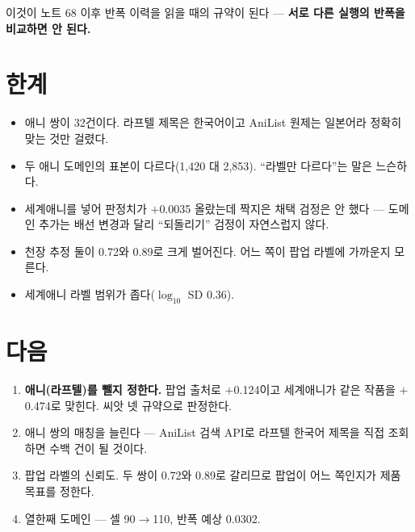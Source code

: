 \documentclass[10pt]{article}
\begin{document}

이것이 노트 68 이후 반폭 이력을 읽을 때의 규약이 된다 --- \textbf{서로 다른
실행의 반폭을 비교하면 안 된다.}

\section{한계}

\begin{itemize}[leftmargin=1.1em,itemsep=0.15em]
\item 애니 쌍이 32건이다. 라프텔 제목은 한국어이고 AniList 원제는 일본어라
      정확히 맞는 것만 걸렸다.
\item 두 애니 도메인의 표본이 다르다(1,420 대 2,853). ``라벨만 다르다''는
      말은 느슨하다.
\item 세계애니를 넣어 판정치가 $+$0.0035 올랐는데 짝지은 채택 검정은 안 했다
      --- 도메인 추가는 배선 변경과 달리 ``되돌리기'' 검정이 자연스럽지 않다.
\item 천장 추정 둘이 0.72와 0.89로 크게 벌어진다. 어느 쪽이 팝업 라벨에 가까운지
      모른다.
\item 세계애니 라벨 범위가 좁다($\log_{10}$ SD 0.36).
\end{itemize}

\section{다음}

\begin{enumerate}[leftmargin=1.3em,itemsep=0.15em]
\item \textbf{애니(라프텔)를 뺄지 정한다.} 팝업 출처로 $+$0.124이고 세계애니가
      같은 작품을 $+$0.474로 맞힌다. 씨앗 넷 규약으로 판정한다.
\item 애니 쌍의 매칭을 늘린다 --- AniList 검색 API로 라프텔 한국어 제목을 직접
      조회하면 수백 건이 될 것이다.
\item 팝업 라벨의 신뢰도. 두 쌍이 0.72와 0.89로 갈리므로 팝업이 어느 쪽인지가
      제품 목표를 정한다.
\item 열한째 도메인 --- 셀 90$\to$110, 반폭 예상 0.0302.
\end{enumerate}
\end{document}
